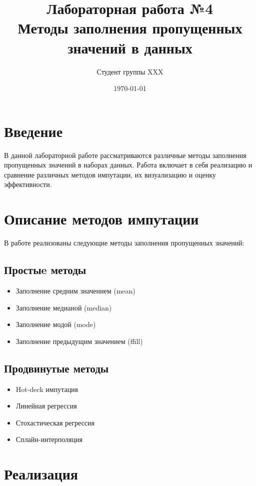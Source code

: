 \documentclass[12pt,a4paper]{article}
\title{Лабораторная работа №4\\Методы заполнения пропущенных значений в данных}
\author{Студент группы XXX}
\date{\today}
\begin{document}
\maketitle

\section{Введение}
В данной лабораторной работе рассматриваются различные методы заполнения пропущенных значений в наборах данных. Работа включает в себя реализацию и сравнение различных методов импутации, их визуализацию и оценку эффективности.

\section{Описание методов импутации}
В работе реализованы следующие методы заполнения пропущенных значений:

\subsection{Простыe методы}
\begin{itemize}
    \item Заполнение средним значением (mean)
    \item Заполнение медианой (median)
    \item Заполнение модой (mode)
    \item Заполнение предыдущим значением (ffill)
\end{itemize}

\subsection{Продвинутые методы}
\begin{itemize}
    \item Hot-deck импутация
    \item Линейная регрессия
    \item Стохастическая регрессия
    \item Сплайн-интерполяция
\end{itemize}

\section{Реализация}
\end{document}
